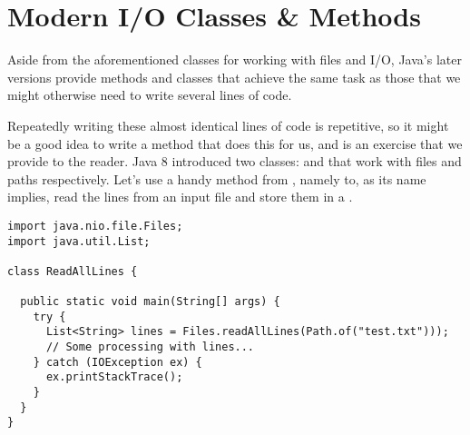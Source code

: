 


\section{Modern I/O Classes \& Methods}
Aside from the aforementioned classes for working with files and I/O, Java's later versions provide methods and classes that achieve the same task as those that we might otherwise need to write several lines of code. 

Repeatedly writing these almost identical lines of code is repetitive, so it might be a good idea to write a method that does this for us, and is an exercise that we provide to the reader. 
Java 8 introduced two classes:  and  that work with files and paths respectively. 
Let's use a handy method from , namely  to, as its name implies, read the lines from an input file and store them in a .

\begin{lstlisting}[language=MyJava]
import java.nio.file.Files;
import java.util.List;

class ReadAllLines {

  public static void main(String[] args) {
    try {
      List<String> lines = Files.readAllLines(Path.of("test.txt")));
      // Some processing with lines...
    } catch (IOException ex) {
      ex.printStackTrace();
    }
  }
}
\end{lstlisting}

